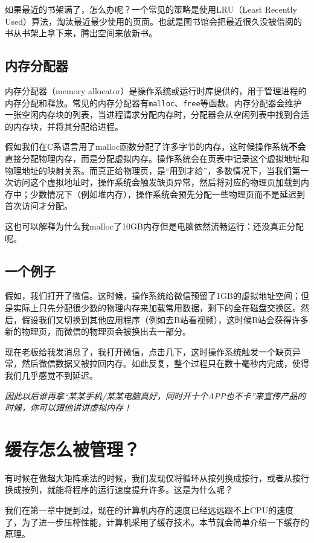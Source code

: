 \documentclass[../main.tex]{subfiles}
\begin{document}
如果最近的书架满了，怎么办呢？一个常见的策略是使用LRU（Least Recently Used）算法，淘汰最近最少使用的页面。也就是图书馆会把最近很久没被借阅的书从书架上拿下来，腾出空间来放新书。

\subsection{内存分配器}

内存分配器（memory allocator）是操作系统或运行时库提供的，用于管理进程的内存分配和释放。常见的内存分配器有\texttt{malloc}、\texttt{free}等函数。内存分配器会维护一张空闲内存块的列表，当进程请求分配内存时，分配器会从空闲列表中找到合适的内存块，并将其分配给进程。

假如我们在C系语言用了malloc函数分配了许多字节的内存，这时候操作系统\textbf{不会}直接分配物理内存，而是分配虚拟内存。操作系统会在页表中记录这个虚拟地址和物理地址的映射关系。而真正给物理页，是“用到才给”，多数情况下，当我们第一次访问这个虚拟地址时，操作系统会触发缺页异常，然后将对应的物理页加载到内存中；少数情况下（例如堆内存），操作系统会预先分配一些物理页而不是延迟到首次访问才分配。

这也可以解释为什么我malloc了10GB内存但是电脑依然流畅运行：还没真正分配呢。

\subsection{一个例子}

假如，我们打开了微信。这时候，操作系统给微信预留了1GB的虚拟地址空间；但是实际上只先分配很少数的物理内存来加载常用数据，剩下的全在磁盘交换区。然后，假设我们又切换到其他应用程序（例如去B站看视频），这时候B站会获得许多新的物理页，而微信的物理页会被换出去一部分。

现在老板给我发消息了，我打开微信，点击几下，这时操作系统触发一个缺页异常，然后微信数据又被拉回内存。如此反复，整个过程只在数十毫秒内完成，使得我们几乎感觉不到延迟。

\emph{因此以后谁再拿“某某手机/某某电脑真好，同时开十个APP也不卡”来宣传产品的时候，你可以跟他讲讲虚拟内存！}

\section{缓存怎么被管理？}

有时候在做超大矩阵乘法的时候，我们发现仅将循环从按列换成按行，或者从按行换成按列，就能将程序的运行速度提升许多。这是为什么呢？

我们在第一章中提到过，现在的计算机内存的速度已经远远跟不上CPU的速度了，为了进一步压榨性能，计算机采用了缓存技术。本节就会简单介绍一下缓存的原理。
\end{document}
